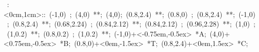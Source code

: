 %

\hbox{
\xy    <1cm,0cm>:<0cm,1cm>::
       (-1,0) ; (4,0) **\dir{-};
       (4,0); (0.8,2.4) **\dir{-};  
       (0.8,0) ; (0.8,2.4) **\dir{-};  
       (-1,0) ; (0.8,2.4) **\dir{-};   
       (0.68,2.24) ; (0.84,2.12) **\dir{-};  
       (0.84,2.12) ; (0.96,2.28) **\dir{-};  
       (1,0) ; (1,0.2) **\dir{-};  
       (0.8,0.2) ; (1,0.2) **\dir{-};  %
       (-1,0)+<-0.75em,-0.5ex> *{A};
       (4,0)+<0.75em,-0.5ex> *{B};
       (0.8,0)+<0em,-1.5ex> *{T};
       (0.8,2.4)+<0em,1.5ex> *{C};
       \endxy}
	   

